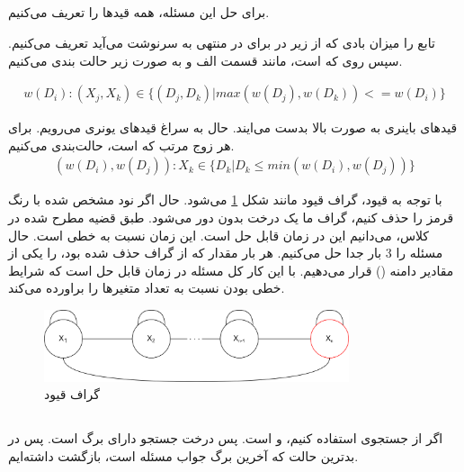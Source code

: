 \documentclass{university}
\begin{document}
\subsection{}
برای حل این مسئله، همه قیدها را تعریف می‌کنیم.

تابع 
را میزان بادی که از زیر در برای در منتهی به سرنوشت 
می‌آید تعریف می‌کنیم. سپس روی 
که 
است، مانند قسمت الف و به صورت زیر حالت بندی می‌کنیم. 

\begin{gather*}
    w(D_i) : (X_j,X_k) \in \{(D_j,D_k)|max(w(D_j), w(D_k))<= w(D_i)\}
\end{gather*}

قیدهای باینری به صورت بالا بدست می‌ایند.
حال به سراغ قیدهای یونری می‌رویم.
برای هر زوج مرتب 
که 
است، حالت‌بندی می‌کنیم.
\begin{gather*}
    (w(D_i), w(D_j)) : X_k \in \{D_k|D_k \leq min(w(D_i), w(D_j))\}
\end{gather*}

با توجه به قیود، گراف قیود مانند شکل 
\ref{fig:constraintGraph}
می‌شود. حال اگر نود مشخص شده با رنگ قرمز را حذف کنیم، گراف ما یک درخت بدون دور می‌شود. طبق قضیه مطرح شده در کلاس، می‌دانیم این 
در زمان 
قابل حل است. این زمان نسبت به 
خطی است. حال مسئله را 3 بار جدا حل می‌کنیم. هر بار مقدار 
که از گراف حذف شده بود، را یکی از مقادیر دامنه 
()
قرار می‌دهیم. با این کار کل مسئله در زمان 
قابل حل است که شرایط خطی بودن نسبت به تعداد متغیرها را براورده می‌کند.

\begin{figure}[htbp]
    \centering
    \includegraphics[width=0.8\textwidth]{assets/constraint-graph.drawio.png}
    \caption{گراف قیود}
    \label{fig:constraintGraph}
\end{figure}

\subsection{}
اگر از جستجوی 
استفاده کنیم، 
و 
است. پس درخت جستجو دارای 
برگ است. پس در بدترین حالت که آخرین برگ جواب مسئله است، 
بازگشت داشته‌ایم. 
\end{document}
